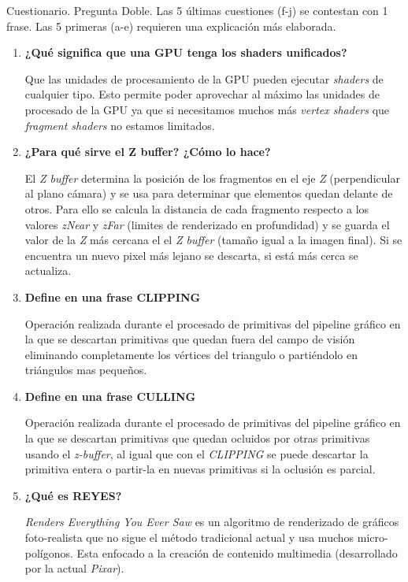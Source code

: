 \begin{pregunta}{Cuestionario. Pregunta Doble. Las 5 últimas cuestiones (f-j) se contestan con 1 frase. Las 5
primeras (a-e) requieren una explicación más elaborada.}
\begin{enumerate}[label=\textbf{(\alph*)}]
\item \textbf{¿Qué significa que una GPU tenga los shaders unificados?}

        Que las unidades de procesamiento de la GPU pueden ejecutar
        \emph{shaders} de cualquier tipo. Esto permite poder aprovechar al
        máximo las unidades de procesado de la GPU ya que si necesitamos muchos
        más \emph{vertex shaders} que \emph{fragment shaders} no estamos
        limitados.

\item \textbf{¿Para qué sirve el Z buffer? ¿Cómo lo hace?}

        El \emph{Z buffer} determina la posición de los fragmentos en el eje
        \emph{Z} (perpendicular al plano cámara) y se usa para determinar que
        elementos quedan delante de otros. Para ello se calcula la distancia de
        cada fragmento respecto a los valores \emph{zNear} y \emph{zFar}
        (limites de renderizado en profundidad) y se guarda el valor de la
        \emph{Z} más cercana el el \emph{Z buffer} (tamaño igual a la imagen
        final). Si se encuentra un nuevo pixel más lejano se descarta, si está
        más cerca se actualiza.

        \pagebreak
\item \textbf{Define en una frase CLIPPING}

        Operación realizada durante el procesado de primitivas del pipeline
        gráfico en la que se descartan primitivas que quedan fuera del campo de
        visión eliminando completamente los vértices del triangulo o partiéndolo
        en triángulos mas pequeños.

\item \textbf{Define en una frase CULLING}

        Operación realizada durante el procesado de primitivas del pipeline
        gráfico en la que se descartan primitivas que quedan ocluidos por otras
        primitivas usando el \emph{z-buffer}, al igual que con el \emph{CLIPPING}
        se puede descartar la primitiva entera o partir-la en nuevas primitivas
        si la oclusión es parcial.

\item \textbf{¿Qué es REYES?}

        \emph{Renders Everything You Ever Saw} es un algoritmo de renderizado de
        gráficos foto-realista que no sigue el método tradicional actual y usa
        muchos micro-polígonos. Esta enfocado a la creación de contenido
        multimedia (desarrollado por la actual \emph{Pixar}).
        \cite{shua_rispec_2011}


\end{enumerate}
\end{pregunta}
